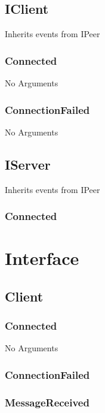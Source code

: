 \subsection{IClient}
Inherits events from IPeer

\subsubsection{Connected}
No Arguments


\subsubsection{ConnectionFailed}
No Arguments

\subsection{IServer}
Inherits events from IPeer

\subsubsection{Connected}
\begin{messagedef}
\end{messagedef}

\section{Interface}

\subsection{Client}

\subsubsection{Connected}
No Arguments

\subsubsection{ConnectionFailed}
\begin{messagedef}
\end{messagedef}
\subsubsection{MessageReceived}

